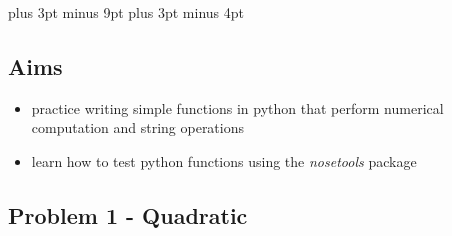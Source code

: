 \documentclass[11pt,a4paper]{report}
\begin{document}
\belowdisplayskip=12pt plus 3pt minus 9pt
\belowdisplayshortskip=7pt plus 3pt minus 4pt

\subsection*{Aims}
\begin{itemize}
 \item practice writing simple functions in python that perform numerical computation and string operations
 \item learn how to test python functions using the \emph{nosetools} package
\end{itemize}


\subsection*{Problem 1 - Quadratic}
\end{document}
